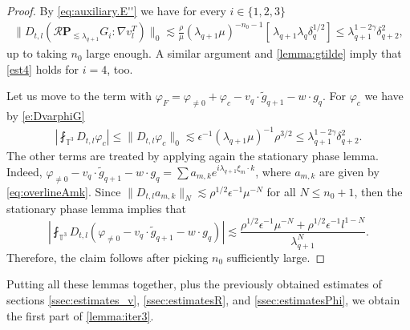 \documentclass[10pt,a4paper]{amsart}
\numberwithin{equation}{section}
\numberwithin{corollario}{section}
\numberwithin{lemma}{section}
\numberwithin{prop}{section}
\theoremstyle{definition}
\theoremstyle{remark}
\newcommand{\T}{\mathbb{T}}
\newcommand{\proj}{\mathbf{P}}
\newcommand{\qq}{_{q+1}}
\newcommand{\qqq}{_{q+2}}
\begin{document}
\begin{proof}
By \eqref{eq:auxiliary.E''} we have for every $i \in \{1,2,3\}$
\begin{align}\label{est4}
    \|D_{t,l}(\mathcal{R}\proj_{\lesssim\lambda\qq}G_i:\nabla v_l^T)\|_0
    \lesssim
    \frac{\rho}{\mu}(\lambda\qq\mu)^{-n_0-1}\left[\,\lambda\qq\lambda_q\delta_q^{1/2}\right]
    \le
    \lambda_{q+1}^{1-2\gamma} \delta\qqq^{2},
\end{align}
up to taking $n_0$ large enough. 
A similar argument and \autoref{lemma:gtilde} imply that \eqref{est4} holds for $i=4$, too.

Let us move to the term with $\varphi_{F} = \varphi_{\neq 0}
  + \varphi_c-  v_q \cdot \tilde{g}\qq - w\cdot g_q $. For $\varphi_c$ we have by \eqref{e:DvarphiG}
\begin{align}
    \left|\fint_{\T^3}  D_{t,l}\varphi_c  \right| \leq \| D_{t,l}\varphi_c\|_0
    \lesssim
    \epsilon^{-1}(\lambda\qq \mu)^{-1} \rho^{3/2} 
    \le
    \lambda_{q+1}^{1-2\gamma} \delta\qqq^{2}.
\end{align}
The other terms are treated by applying again the stationary phase lemma. Indeed, $\varphi_{\neq 0}
  -  v_q \cdot \tilde{g}\qq - w\cdot g_q=\sum {a}_{m,k} e^{i\lambda\qq\xi_m \cdot k}$, where ${a}_{m,k}$ are given by \eqref{eq:overlineAmk}.
  Since $\|D_{t,l}{a}_{m,k}\|_N\lesssim \rho^{1/2}\epsilon^{-1}\mu^{-N}$ for all $N\le n_0+1$, then the stationary phase lemma implies that 
  \begin{equation}
      \left|\fint_{\T^3}D_{t,l}(\varphi_{\neq 0}
  -  v_q \cdot \tilde{g}\qq - w\cdot g_q)\right|\lesssim\frac{\rho^{1/2}\epsilon^{-1}\mu^{-N}+\rho^{1/2}\epsilon^{-1}l^{1-N}}{\lambda\qq^N}.
  \end{equation}
  Therefore, the claim follows after picking $n_0$ sufficiently large.
\end{proof}
Putting all these lemmas together, plus the previously obtained estimates of sections \autoref{ssec:estimates_v}, \autoref{ssec:estimatesR}, and \autoref{ssec:estimatesPhi}, we obtain the first part of \autoref{lemma:iter3}.
\end{document}
